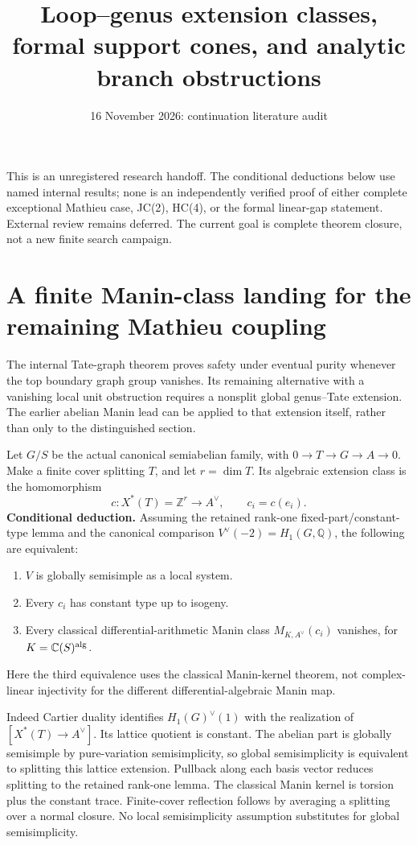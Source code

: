 \documentclass{article}
\newcommand{\Q}{\mathbb Q}\newcommand{\C}{\mathbb C}\newcommand{\Z}{\mathbb Z}
\begin{document}
\title{Loop--genus extension classes, formal support cones, and analytic branch obstructions}
\date{16 November 2026: continuation literature audit}
\maketitle
This is an unregistered research handoff. The conditional deductions below use named internal results; none is an independently verified proof of either complete exceptional Mathieu case, JC(2), HC(4), or the formal linear-gap statement. External review remains deferred. The current goal is complete theorem closure, not a new finite search campaign.

\section{A finite Manin-class landing for the remaining Mathieu coupling}
The internal Tate-graph theorem proves safety under eventual purity whenever the top boundary graph group vanishes. Its remaining alternative with a vanishing local unit obstruction requires a nonsplit global genus--Tate extension. The earlier abelian Manin lead can be applied to that extension itself, rather than only to the distinguished section.

Let $G/S$ be the actual canonical semiabelian family, with $0\to T\to G\to A\to0$. Make a finite cover splitting $T$, and let $r=\dim T$. Its algebraic extension class is the homomorphism
\[
 c:X^*(T)=\Z^r\longrightarrow A^\vee,\qquad c_i=c(e_i).
\]
\textbf{Conditional deduction.} Assuming the retained rank-one fixed-part/constant-type lemma and the canonical comparison $V^\vee(-2)=H_1(G,\Q)$, the following are equivalent:
\begin{enumerate}
\item $V$ is globally semisimple as a local system.
\item Every $c_i$ has constant type up to isogeny.
\item Every classical differential-arithmetic Manin class $M_{K,A^\vee}(c_i)$ vanishes, for $K=\C(S)^{\rm alg}$.
\end{enumerate}
Here the third equivalence uses the classical Manin-kernel theorem, not complex-linear injectivity for the different differential-algebraic Manin map.

Indeed Cartier duality identifies $H_1(G)^\vee(1)$ with the realization of $[X^*(T)\to A^\vee]$. Its lattice quotient is constant. The abelian part is globally semisimple by pure-variation semisimplicity, so global semisimplicity is equivalent to splitting this lattice extension. Pullback along each basis vector reduces splitting to the retained rank-one lemma. The classical Manin kernel is torsion plus the constant trace. Finite-cover reflection follows by averaging a splitting over a normal closure. No local semisimplicity assumption substitutes for global semisimplicity.
\end{document}
